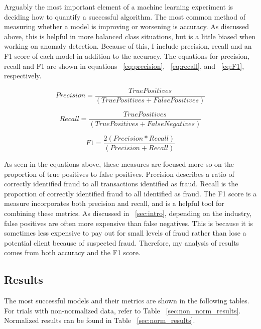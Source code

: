 \documentclass[midd]{thesis}
\begin{document}
Arguably the most important element of a machine learning experiment is deciding how to quantify a successful algorithm. The most common method of measuring whether a model is improving or worsening is accuracy. As discussed above, this is helpful in more balanced class situations, but is a little biased when working on anomaly detection. Because of this, I include precision, recall and an F1 score of each model in addition to the accuracy. The equations for precision, recall and F1 are shown in equations ~\ref{eq:precision}, ~\ref{eq:recall}, and ~\ref{eq:F1}, respectively. 

\begin{equation}
\label{eq:precision}
    Precision = \frac{True Positives} {(True Positives + False Positives)}
\end{equation}

\begin{equation}
\label{eq:recall}
    Recall = \frac{True Positives}{ (True Positives + False Negatives)}
\end{equation}

\begin{equation}
\label{eq:F1}
    F1 = \frac{2 (Precision * Recall)} {(Precision + Recall)}
\end{equation}


As seen in the equations above, these measures are focused more so on the proportion of true positives to false positives. Precision describes a ratio of correctly identified fraud to all transactions identified as fraud. Recall is the proportion of correctly identified fraud to all identified as fraud. The F1 score is a measure incorporates both precision and recall, and is a helpful tool for combining these metrics. As discussed in ~\ref{sec:intro}, depending on the industry, false positives are often more expensive than false negatives. This is because it is sometimes less expensive to pay out for small levels of fraud rather than lose a potential client because of suspected fraud. Therefore, my analysis of results comes from both accuracy and the F1 score.



\subsection{Results}

The most successful models and their metrics are shown in the following tables. For trials with non-normalized data, refer to Table ~\ref{sec:non_norm_results}. Normalized results can be found in Table ~\ref{sec:norm_results}. 
\end{document}
